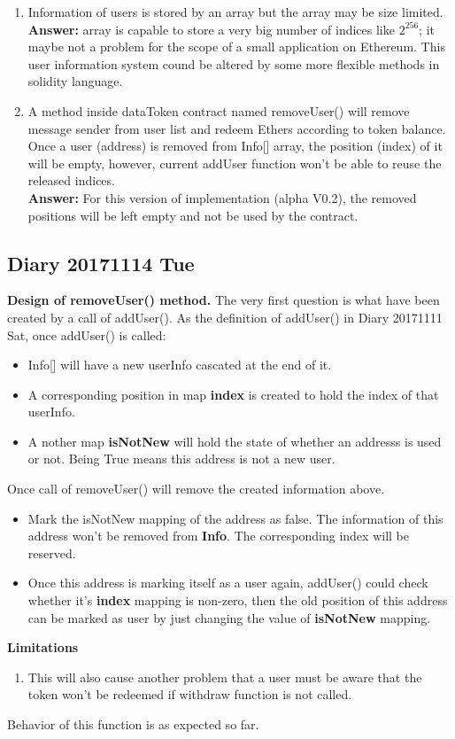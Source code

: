 \begin{enumerate}
    \item Information of users is stored by an array 
    but the array may be size limited.\\
    \textbf{Answer:} array is capable to store a very big number of 
    indices like $2^{256}$; it maybe not a problem for the scope of a
    small application on Ethereum. This user information system cound 
    be altered by some more flexible methods in solidity language.
    \item  A method inside dataToken contract named removeUser() will 
    remove message sender from user list and redeem Ethers according
    to token balance.
    Once a user (address) is removed from Info[] array,
    the position (index) of it 
    will be empty, however, current addUser function won't be able
    to reuse the released indices.\\
    \textbf{Answer:} For this version of implementation (alpha V0.2), the removed
    positions will be left empty and not be used by the contract. 
   
\end{enumerate}
\subsection{Diary 20171114 Tue}
\textbf{Design of removeUser() method.}
The very first question is what have been created
by a call of addUser(). As the definition of addUser() in Diary 20171111 Sat,
once addUser() is called:
\begin{itemize}
    \item Info[] will have a new userInfo cascated at the end of it. 
    \item A corresponding position in map \textbf{index} is created to hold 
    the index of that userInfo.
    \item A nother map \textbf{isNotNew} will hold the state of whether an
    addresss is used or not. Being True means this address is not a new user.
    \\
\end{itemize}
Once call of removeUser() will remove the created information above.
\begin{itemize}
    \item Mark the isNotNew mapping of the address as false.
    The information of this address won't be removed from \textbf{Info}.
    The corresponding index will be reserved.
    \item Once this address is marking itself as a user again,
    addUser() could check whether it's \textbf{index} mapping
    is non-zero, then the old position of this address can be marked as
    user by just changing the value of \textbf{isNotNew} mapping.
    \\
\end{itemize}
\textbf{Limitations}
\begin{enumerate}
    \item This will also cause another problem that a user must be aware
    that the token won't be redeemed if withdraw function is not called.
\end{enumerate}
Behavior of this function is as expected so far.

